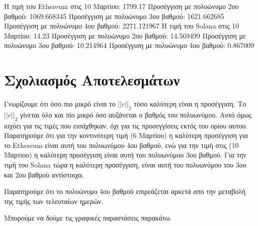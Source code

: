 \documentclass{article}
\begin{document}
 Η τιμή του Ethereum στις 10 Μαρτίου: 1799.17
     Προσέγγιση με πολυώνυμο 2ου βαθμού: 1069.668345
     Προσέγγιση με πολυώνυμο 3ου βαθμού: 1621.662685
     Προσέγγιση με πολυώνυμο 4ου βαθμού: 2271.121967
 Η τιμή του Solana στις 10 Μαρτίου: 14.23
     Προσέγγιση με πολυώνυμο 2ου βαθμού: 14.569499
     Προσέγγιση με πολυώνυμο 3ου βαθμού: 10.214964
     Προσέγγιση με πολυώνυμο 4ου βαθμού: 0.867009
     
    \section{Σχολιασμός Αποτελεσμάτων}
    Γνωρίζουμε ότι όσο πιο μικρό είναι το $||r||_2$ τόσο καλύτερη είναι η προσέγγιση.
    Το $||r||_2$ γίνεται όλο και πίο μικρό όσο αυξάνεται ο βαθμός του πολυωνύμου.
    Αυτό όμως ισχύει για τις τιμές που εισάχθηκαν, όχι για τις προσεγγίσεις εκτός του ορίου αυτου. 
    Παρατηρούμε ότι για την κοντινότερη τιμή (6 Μαρτίου) η καλύτερη προσέγγιση για το Ethereum είναι αυτή του πολυωνύμου 4ου βαθμού, ενώ για την τιμή στις (10 Μαρτιου) η καλύτερη προσέγγιση είναι αυτή του πολυωνύμου 3ου βαθμού. 
    Για την τιμή του Solana τώρα η καλύτερη προσέγγιση, είναι αυτή του πολυωνύμου του 3ου και 2ου βαθμού αντίστοιχα.
    
    Παρατηρούμε ότι το πολυώνυμο 4ου βαθμού επιρεάζεται αρκετά απο την μεταβολή της τιμής
    των τελευταίων ημερών. 

    Μπορούμε να δούμε τις γραφικές παραστάσεις παρακάτω.
\end{document}
